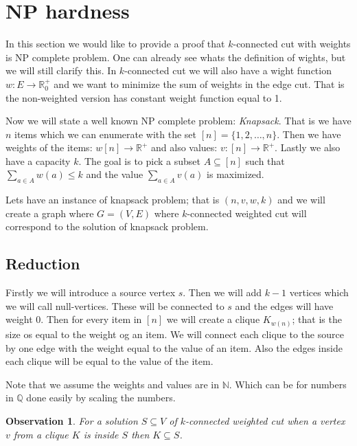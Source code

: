 \documentclass{article}
\theoremstyle{plain}
\newtheorem{observ}[thm]{Observation}
\theoremstyle{plain}
\theoremstyle{remark}
\begin{document}
	\section{NP hardness}
	
	In this section we would like to provide a proof that $k$-connected cut with weights is NP complete problem. One can already see whats the definition of wights, but we will still clarify this. In $k$-connected cut we will also have a wight function $w : E \to \mathbb{R}^+_0$ and we want to minimize the sum of weights in the edge cut. That is the non-weighted version has constant  weight function equal to 1.
	
	Now we will state a well known NP complete problem: \textit{Knapsack}. That is we have $n$ items which we can enumerate with the set $[n] = \{1, 2, \dots, n\}$. Then we have weights of the items: $w [n] \to \mathbb{R}^+$ and also values: $v : [n] \to \mathbb{R}^+$. Lastly we also have a capacity $k$. The goal is to pick a subset $A \subseteq [n]$ such that $\sum_{a \in A} w(a) \leq k$ and the value $\sum_{a \in A} v(a)$ is maximized.
	
	Lets have an instance of knapsack problem; that is $(n, v, w, k)$ and we will create a graph where $G = (V,E)$ where $k$-connected weighted cut will correspond to the solution of knapsack problem.
	
	\subsection{Reduction}
	
	Firstly we will introduce a source vertex $s$. Then we will add $k - 1$ vertices which we will call null-vertices. These will be connected to $s$ and the edges will have weight 0. Then for every item in $[n]$ we will create a clique $K_{w(n)}$; that is the size os equal to the weight og an item. We will connect each clique to the source by one edge with the weight equal to the value of an item. Also the edges inside each clique will be equal to the value of the item.
	
	Note that we assume the weights and values are in $\mathbb{N}$. Which can be for numbers in $\mathbb{Q}$ done easily by scaling the numbers.
	
	\begin{observ}
		For a solution $S \subseteq V$ of $k$-connected weighted cut when a vertex $v$ from a clique $K$ is inside $S$ then $K \subseteq S$.
	\end{observ}
\end{document}
